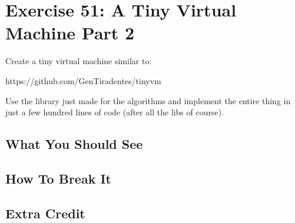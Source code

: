 \chapter{Exercise 51: A Tiny Virtual Machine Part 2}

Create a tiny virtual machine similar to:

https://github.com/GenTiradentes/tinyvm

Use the library just made for the algorithms and implement the entire thing in just a few
hundred lines of code (after all the libs of course).


\section{What You Should See}


\section{How To Break It}


\section{Extra Credit}



